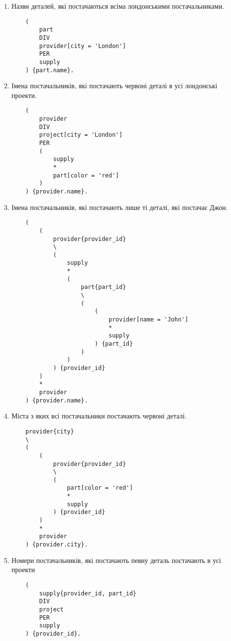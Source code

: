 \begin{enumerate}
    \item Назви деталей, які постачаються всіма лондонськими постачальниками.
    \begin{verbatim}
    (
        part
        DIV
        provider[city = 'London']
        PER 
        supply
    ) {part.name}.
    \end{verbatim}
    
    \item Імена постачальників, які постачають червоні деталі в усі лондонські проекти.
    \begin{verbatim}
    (
        provider
        DIV
        project[city = 'London']
        PER
        (
            supply
            *
            part[color = 'red']
        )
    ) {provider.name}.
    \end{verbatim}
    
    \item Імена постачальників, які постачають лише ті деталі, які постачає Джон.
    \begin{verbatim}
    (
        (
            provider{provider_id}
            \ 
            (
                supply
                *
                (
                    part{part_id} 
                    \ 
                    (
                        (
                            provider[name = 'John']
                            *
                            supply
                        ) {part_id} 
                    )
                )
            ) {provider_id}
        )
        * 
        provider
    ) {provider.name}.
    \end{verbatim}
    
    \item Міста з яких всі постачальники постачають червоні деталі.
    \begin{verbatim}
    provider{city} 
    \ 
    (
        (
            provider{provider_id}
            \ 
            (
                part[color = 'red']
                *
                supply
            ) {provider_id}
        )
        *
        provider
    ) {provider.city}.
    \end{verbatim}
    
    \item Номери постачальників, які постачають певну деталь постачають в усі проекти
    \begin{verbatim}
    (
        supply{provider_id, part_id} 
        DIV
        project
        PER
        supply
    ) {provider_id}.
    \end{verbatim}
\end{enumerate}

